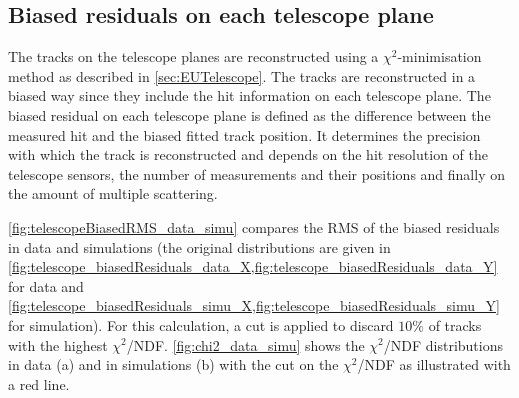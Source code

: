 \subsection{Biased residuals on each telescope plane}

The tracks on the telescope planes are reconstructed using a
$\chi^2$-minimisation method as described in
\cref{sec:EUTelescope}. The tracks are reconstructed in a biased way
since they include the hit information on each telescope plane. The
biased residual on each telescope plane is defined as the difference
between the measured hit and the biased fitted track position. It
determines the precision with which the track is reconstructed and
depends on the hit resolution of the telescope sensors, the number of
measurements and their positions and finally on the amount of multiple
scattering.

\cref{fig:telescopeBiasedRMS_data_simu} compares the RMS of the biased
residuals in data and simulations (the original distributions are
given in
\cref{fig:telescope_biasedResiduals_data_X,fig:telescope_biasedResiduals_data_Y}
for data and
\cref{fig:telescope_biasedResiduals_simu_X,fig:telescope_biasedResiduals_simu_Y}
for simulation). For this calculation, a cut is applied to discard
$10\%$ of tracks with the highest
$\chi^2$/NDF. \cref{fig:chi2_data_simu} shows the $\chi^2$/NDF
distributions in data (a) and in simulations (b) with the cut on the
$\chi^2$/NDF as illustrated with a red line.

